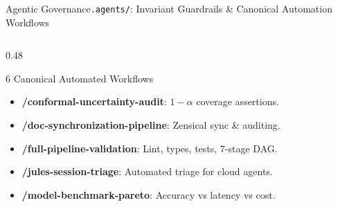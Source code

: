 \begin{frame}{Agentic Governance}{\texttt{.agents/}: Invariant Guardrails \& Canonical Automation Workflows}
\begin{columns}[T]
\begin{column}{0.48\textwidth}
\begin{block}{6 Canonical Automated Workflows}
\begin{itemize}
                    \item \textbf{/conformal-uncertainty-audit}: $1-\alpha$ coverage assertions.
                    \item \textbf{/doc-synchronization-pipeline}: Zensical sync \& auditing.
                    \item \textbf{/full-pipeline-validation}: Lint, types, tests, 7-stage DAG.
                    \item \textbf{/jules-session-triage}: Automated triage for cloud agents.
                    \item \textbf{/model-benchmark-pareto}: Accuracy vs latency vs cost.
                \end{itemize}
            \end{block}
        \end{column}
    \end{columns}

\end{frame}

